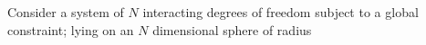Consider a system of $N$ interacting degrees of freedom subject to a global constraint; lying on an $N$ dimensional sphere of radius 